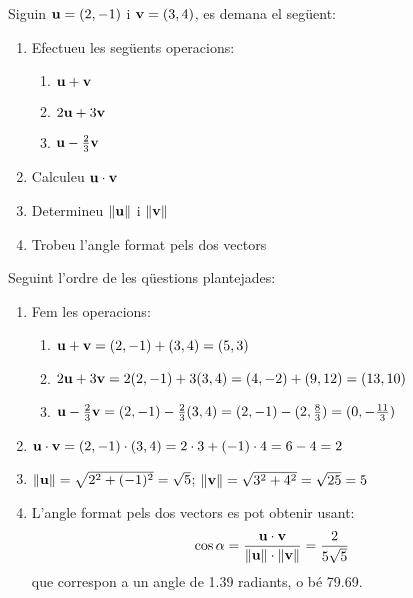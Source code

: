   \Exercise Siguin $\textbf{u}=(2,-1)$ i $\textbf{v}=(3,4)$, es demana el següent:
  \begin{enumerate}
    \item Efectueu les següents operacions:
    \begin{enumerate}
      \item $\textbf{u}+\textbf{v}$
      \item $2\textbf{u}+3\textbf{v}$
      \item $\textbf{u}-\frac{2}{3}\textbf{v}$
    \end{enumerate}
    \item Calculeu $\textbf{u}\cdot \textbf{v}$
    \item Determineu $\norm{\textbf{u}}$ i $\norm{\textbf{v}}$
    \item Trobeu l'angle format pels dos vectors
  \end{enumerate}

  \Answer Seguint l'ordre de les qüestions plantejades:
  \begin{enumerate}
    \item Fem les operacions:
    \begin{enumerate}
      \item $\textbf{u}+\textbf{v}=(2,-1)+(3,4)=(5,3)$
      \item $2\textbf{u}+3\textbf{v}=2(2,-1)+3(3,4)=(4,-2)+(9,12)=(13,10)$
      \item $\textbf{u}-\frac{2}{3}\textbf{v}=(2,-1)-\frac{2}{3}(3,4)=(2,-1)-(2,\frac{8}{3})=(0,-\frac{11}{3})$
    \end{enumerate}
    \item $\textbf{u}\cdot \textbf{v}=(2,-1)\cdot(3,4)=2\cdot3+(-1)\cdot4=6-4=2$
    \item $\norm{\textbf{u}}=\sqrt{2^2+(-1)^2}=\sqrt{5}$; $\norm{\textbf{v}}=\sqrt{3^2+4^2}=\sqrt{25}=5$
    \item L'angle format pels dos vectors es pot obtenir usant:
    \[\cos{\alpha}=\frac{\textbf{u}\cdot \textbf{v}}{\norm{\textbf{u}} \cdot \norm{\textbf{v}}}=\frac{2}{5\sqrt{5}}
    \]
    que correspon a un angle de 1.39 radiants, o bé 79.69\degree.
  \end{enumerate}
  \blacksquare
